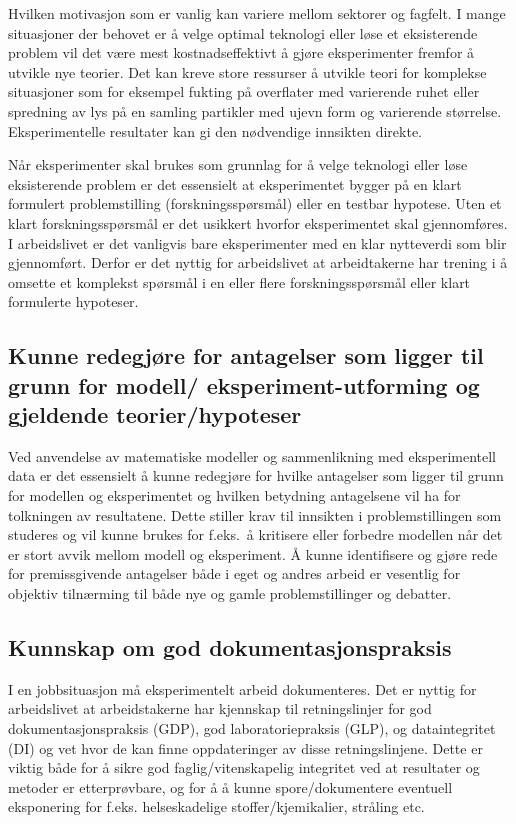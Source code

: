 \documentclass{article}
\begin{document}
Hvilken motivasjon som er vanlig kan variere mellom sektorer og fagfelt.
I mange situasjoner der behovet er å velge optimal teknologi eller løse et eksisterende problem vil det være mest kostnadseffektivt å gjøre eksperimenter fremfor å utvikle nye teorier.
Det kan kreve store ressurser å utvikle teori for komplekse situasjoner som for eksempel fukting på overflater med varierende ruhet eller spredning av lys på en samling partikler med ujevn form og varierende størrelse.
Eksperimentelle resultater kan gi den nødvendige innsikten direkte.

Når eksperimenter skal brukes som grunnlag for å velge teknologi eller løse eksisterende problem er det essensielt at eksperimentet bygger på en klart formulert problemstilling (forskningsspørsmål) eller en testbar hypotese. Uten et klart forskningsspørsmål er det usikkert hvorfor eksperimentet skal gjennomføres. I arbeidslivet er det vanligvis bare eksperimenter med en klar nytteverdi som blir gjennomført. Derfor er det nyttig for arbeidslivet at arbeidtakerne har trening i å omsette et komplekst spørsmål i en eller flere forskningsspørsmål eller klart formulerte hypoteser.

\subsection{Kunne redegjøre for antagelser som ligger til grunn for modell/ eksperiment-utforming og gjeldende teorier/hypoteser}
Ved anvendelse av matematiske modeller og sammenlikning med eksperimentell data er det essensielt å kunne redegjøre for hvilke antagelser som ligger til grunn for modellen og eksperimentet og hvilken betydning antagelsene vil ha for tolkningen av resultatene.
Dette stiller krav til innsikten i problemstillingen som studeres og vil kunne brukes for f.eks.~å kritisere eller forbedre modellen når det er stort avvik mellom modell og eksperiment.
Å kunne identifisere og gjøre rede for premissgivende antagelser både i eget og andres arbeid er vesentlig for objektiv tilnærming til både nye og gamle problemstillinger og debatter.

\subsection{Kunnskap om god dokumentasjonspraksis}
I en jobbsituasjon må eksperimentelt arbeid dokumenteres. Det er nyttig for arbeidslivet at arbeidstakerne har kjennskap til retningslinjer for god dokumentasjonspraksis (GDP), god laboratoriepraksis (GLP), og dataintegritet (DI) og vet hvor de kan finne oppdateringer av disse retningslinjene.
Dette er viktig både for å sikre god faglig/vitenskapelig integritet ved at resultater og metoder er etterprøvbare, og for å å kunne spore/dokumentere eventuell eksponering for f.eks. helseskadelige stoffer/kjemikalier, stråling etc.
\end{document}
